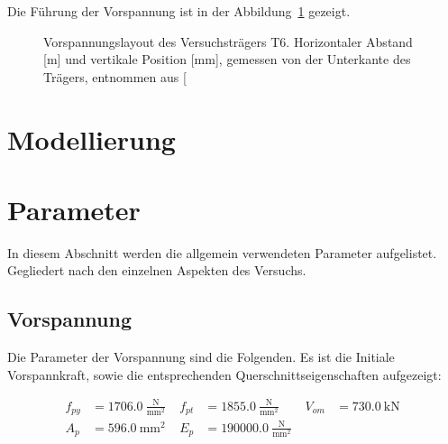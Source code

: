 \documentclass[
  11pt,
  letterpaper,
]{scrreprt}
\begin{document}
Die Führung der Vorspannung ist in der
Abbildung~\ref{fig-vorspannung_t6} gezeigt.

\begin{figure}[H]


\caption{\label{fig-vorspannung_t6}Vorspannungslayout des
Versuchsträgers T6. Horizontaler Abstand {[}m{]} und vertikale Position
{[}mm{]}, gemessen von der Unterkante des Trägers, entnommen aus
{[}\citeproc{ref-sigrist_versuche_1993}{5}{]}}

\end{figure}%

\section{Modellierung}\label{modellierung}

\section{Parameter}\label{parameter}

In diesem Abschnitt werden die allgemein verwendeten Parameter
aufgelistet. Gegliedert nach den einzelnen Aspekten des Versuchs.

\subsection{Vorspannung}\label{vorspannung}

Die Parameter der Vorspannung sind die Folgenden. Es ist die Initiale
Vorspannkraft, sowie die entsprechenden Querschnittseigenschaften
aufgezeigt:

$$
\begin{aligned}
f_{py} &= 1706.0\ \frac{\mathrm{N}}{\mathrm{mm}^{2}} \; 
 &f_{pt} &= 1855.0\ \frac{\mathrm{N}}{\mathrm{mm}^{2}} \; 
 &V_{om} &= 730.0\ \mathrm{kN} \; 
\\[12pt]
 A_{p} &= 596.0\ \mathrm{mm}^{2} \; 
 &E_{p} &= 190000.0\ \frac{\mathrm{N}}{\mathrm{mm}^{2}} \;
\end{aligned}
$$
\end{document}
